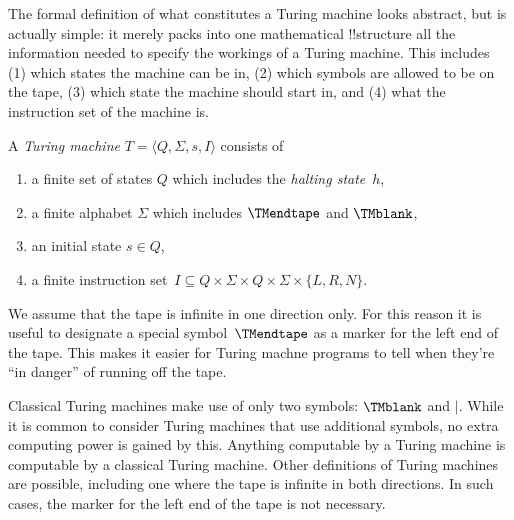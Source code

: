 \documentclass[../../include/open-logic-section]{subfiles}
\begin{document}

\begin{explain}
The formal definition of what constitutes a Turing machine looks
abstract, but is actually simple: it merely packs into one
mathematical !!{structure} all the information needed to specify the
workings of a Turing machine. This includes (1) which states the
machine can be in, (2) which symbols are allowed to be on the tape, (3)
which state the machine should start in, and (4) what the instruction
set of the machine is.
\end{explain}

\begin{defn}
A \emph{Turing machine} $T = \langle Q, \Sigma, s, I\rangle$ consists of
\begin{enumerate}
\item a finite set of states $Q$ which includes the \emph{halting state}~$h$,
\item a finite alphabet $\Sigma$ which includes $\TMendtape$ and
  $\TMblank$,
\item an initial state $s \in Q$,
\item a finite instruction set~$I \subseteq Q \times \Sigma \times Q
  \times \Sigma \times \{L, R, N\}$.
\end{enumerate}
\end{defn}

\begin{explain}
We assume that the tape is infinite in one direction only. For this
reason it is useful to designate a special symbol~$\TMendtape$ as
a marker for the left end of the tape. This makes it easier for
Turing machne programs to tell when they're ``in danger'' of running
off the tape. 

Classical Turing machines make use of only two symbols: $\TMblank$ and $\mid$. While it is common to consider Turing machines that use additional symbols, no extra computing power is gained by this. Anything computable by a Turing machine is computable by a classical Turing machine. Other definitions of Turing machines are possible,
including one where the tape is infinite in both directions. In such cases, the marker for the left end of the tape is not necessary. 
\end{explain}
\end{document}

